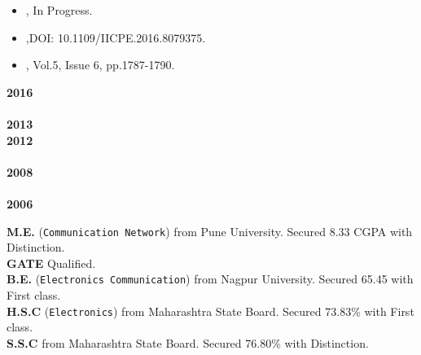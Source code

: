 \documentclass[a4paper,11pt]{memoir} %
\begin{document}
\begin{itemize}
 \renewcommand{\labelitemi}{\bluebullet}
 \item {}, In Progress.
\SmallSep
 \item {},DOI: 10.1109/IICPE.2016.8079375.
\SmallSep 
 \item {}, Vol.5, Issue 6, pp.1787-1790.
\end{itemize}


\Sep %
\begin{minipage}[t]{0.05\columnwidth}
\textbf{2016}\\
\\
\textbf{2013}\\
\textbf{2012}\\
\\
\textbf{2008}\\ 
\\
\textbf{2006}
\end{minipage}
\hfill
\begin{minipage}[t]{0.90\columnwidth}
\textbf{M.E.} (\texttt{Communication Network}) from Pune University. Secured 8.33 CGPA with Distinction.\\
\textbf{GATE} Qualified.\\
\textbf{B.E.} (\texttt{Electronics Communication}) from Nagpur University. Secured 65.45 with First class.\\
\textbf{H.S.C} (\texttt{Electronics}) from Maharashtra State Board. Secured 73.83\% with First class.\\
\textbf{S.S.C} from Maharashtra State Board. Secured 76.80\% with Distinction.
\end{minipage} \\


\end{document}
